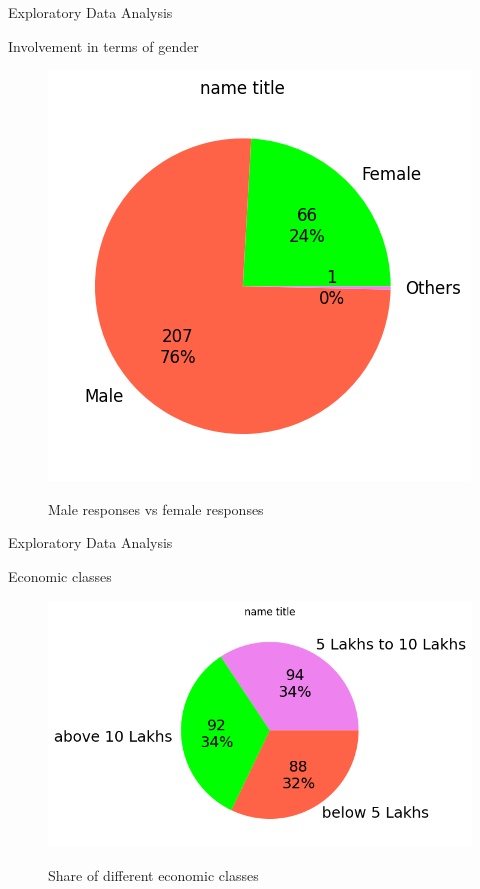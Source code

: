\documentclass{beamer}
\begin{document}
\begin{frame}{Exploratory Data Analysis}
\begin{block}{Involvement in terms of gender}
\begin{figure}
      \centering
    \caption{Male responses vs female responses}
    \includegraphics[scale = 0.55]{pie_gender.png}  
    \label{fig:side-by-side}
\end{figure}
\end{block}
\end{frame}
\begin{frame}{Exploratory Data Analysis}
\begin{block}{Economic classes}
\begin{figure}
      \centering
    \caption{Share of different economic classes}
    \includegraphics[scale = 0.55]{pie_income.png}  
    \label{fig:side-by-side}
\end{figure}
\end{block}
\end{frame}
\end{document}
